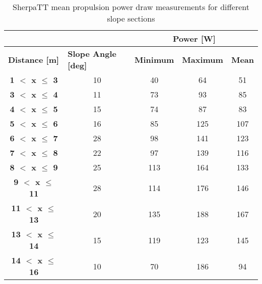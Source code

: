 \begin{table}[h]
\footnotesize
\centering
\caption{SherpaTT mean propulsion power draw measurements for different slope sections}
\label{tab:sherpatt-upslope-terrain-local-media-measurement-summary}
\begin{tabular}{cc|c|c|c|}
\cline{3-5}
\multicolumn{1}{l}{} & \multicolumn{1}{l|}{} & \multicolumn{3}{c|}{\textbf{Power {[}W{]}}} \\ \hline
\multicolumn{1}{|l|}{\textbf{Distance {[}m{]}}} & \multicolumn{1}{l|}{\textbf{Slope Angle {[}deg{]}}} & \multicolumn{1}{l|}{\textbf{Minimum}} & \multicolumn{1}{l|}{\textbf{Maximum}} & \multicolumn{1}{l|}{\textbf{Mean}} \\ \hline
\multicolumn{1}{|c|}{\textbf{1 $<$ x $\leq$ 3}} & 10 & 40 & 64 & 51 \\ \hline
\multicolumn{1}{|c|}{\textbf{3 $<$ x $\leq$ 4}} & 11 & 73 & 93 & 85 \\ \hline
\multicolumn{1}{|c|}{\textbf{4 $<$ x $\leq$ 5}} & 15 & 74 & 87 & 83 \\ \hline
\multicolumn{1}{|c|}{\textbf{5 $<$ x $\leq$ 6}} & 16 & 85 & 125 & 107 \\ \hline
\multicolumn{1}{|c|}{\textbf{6 $<$ x $\leq$ 7}} & 28 & 98 & 141 & 123 \\ \hline
\multicolumn{1}{|c|}{\textbf{7 $<$ x $\leq$ 8}} & 22 & 97 & 139 & 116 \\ \hline
\multicolumn{1}{|c|}{\textbf{8 $<$ x $\leq$ 9}} & 25 & 113 & 164 & 133 \\ \hline
\multicolumn{1}{|c|}{\textbf{9 $<$ x $\leq$ 11}} & 28 & 114 & 176 & 146 \\ \hline
\multicolumn{1}{|c|}{\textbf{11 $<$ x $\leq$ 13}} & 20 & 135 & 188 & 167 \\ \hline
\multicolumn{1}{|c|}{\textbf{13 $<$ x $\leq$ 14}} & 15 & 119 & 123 & 145 \\ \hline
\multicolumn{1}{|c|}{\textbf{14 $<$ x $\leq$ 16}} & 10 & 70 & 186 & 94 \\ \hline
\end{tabular}
\end{table}
